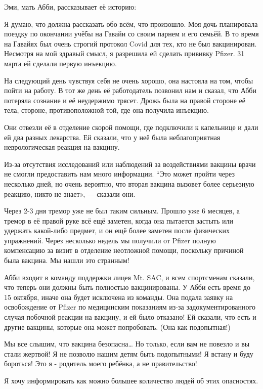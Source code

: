 Эми, мать Абби, рассказывает её историю:

Я думаю, что должна рассказать обо всём, что произошло. Моя дочь планировала
поездку по окончании учёбы на Гавайи со своим парнем и его семьёй. В то время на
Гавайях был очень строгий протокол Covid для тех, кто не был
вакцинирован. Несмотря на мой здравый смысл, я разрешила ей сделать прививку
Pfizer. 31 марта ей сделали первую инъекцию.

На следующий день чувствуя себя не очень хорошо, она настояла на том, чтобы
пойти на работу. В тот же день её работодатель позвонил нам и сказал, что Абби
потеряла сознание и её неудержимо трясет. Дрожь была на правой стороне её тела,
стороне, противоположной той, где она получила инъекцию.

Они отвезли её в отделение скорой помощи, где подключили к капельнице и дали ей
два разных лекарства. Ей сказали, что у неё была неблагоприятная неврологическая
реакция на вакцину.

Из-за отсутствия исследований или наблюдений за воздействиями вакцины врачи не
смогли предоставить нам много информации. ``Это может пройти через несколько
дней, но очень вероятно, что вторая вакцина вызовет более серьезную реакцию,
никто не знает», — сказали они.

Через 2-3 дня тремор уже не был таким сильным. Прошло уже 6 месяцев, а тремор в
её правой руке всё ещё заметен, когда она пытается застыть или удержать
какой-либо предмет, и он ещё более заметен после физических упражнений. Через
несколько недель мы получили от Pfizer полную компенсацию за визит в отделение
неотложной помощи, поскольку причиной была вакцина. Мы нашли это странным!


Абби входит в команду поддержки лицея Mt. SAC, и всем спортсменам сказали, что
теперь они должны быть полностью вакцинированы. У Абби есть время до 15 октября,
иначе она будет исключена из команды. Она подала заявку на освобождение от
Pfizer по медицинским показаниям из-за задокументированного случая побочной
реакции на вакцину, и ей было отказано! Ей сказали, что есть и другие вакцины,
которые она может попробовать. (Она как подопытная!)

Мы все слышим, что вакцина безопасна… Но только, если вам не повезло и вы стали
жертвой! Я не позволю нашим детям быть подопытными! Я встану и буду бороться!
Это я - родитель моего ребёнка, а не правительство!

Я хочу информировать как можно большее количество людей об этих опасностях.
